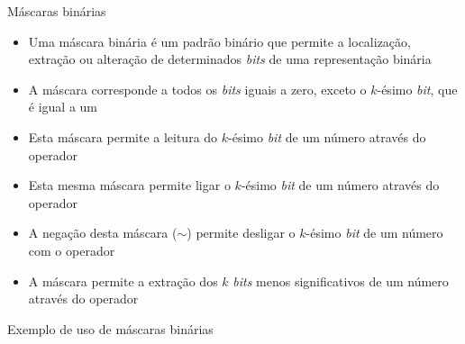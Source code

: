 \begin{frame}[fragile]{Máscaras binárias}

    \begin{itemize}
        \item Uma máscara binária é um padrão binário que permite a localização, extração ou
            alteração de determinados \textit{bits} de uma representação binária

        \item A máscara  corresponde a todos os \textit{bits} iguais a zero,
            exceto o $k$-ésimo \textit{bit}, que é igual a um

        \item Esta máscara permite a leitura do $k$-ésimo \textit{bit} de um número através do
            operador 

        \item Esta mesma máscara permite ligar o $k$-ésimo \textit{bit} de um número através do 
            operador 

        \item A negação desta máscara ($\sim$) permite desligar o $k$-ésimo
            \textit{bit} de um número com o operador 

        \item A máscara  permite a extração dos $k$ \textit{bits} menos
            significativos de um número através do operador 
    \end{itemize}

\end{frame}

\begin{frame}[fragile]{Exemplo de uso de máscaras binárias}
\end{frame}

